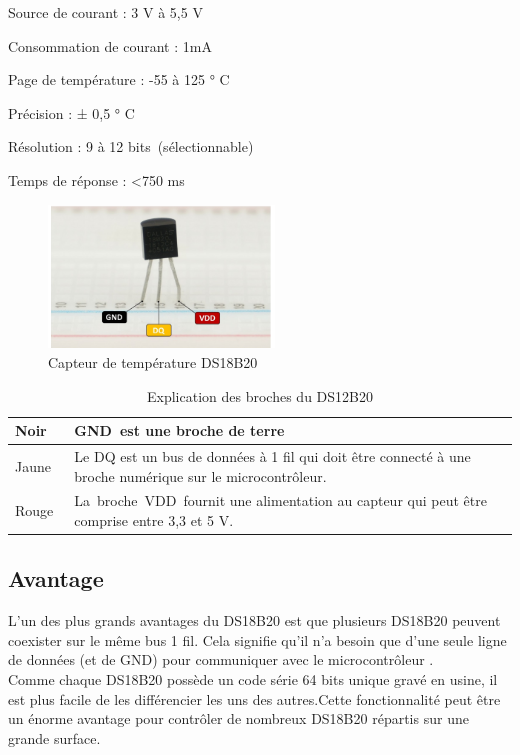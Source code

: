 \begin{filleditem}
	\item Source de courant	: 3 V à 5,5 V
	\item Consommation de courant :	1mA
	\item Page de température :	-55 à 125 ° C
	\item Précision : 	± 0,5 ° C
	\item Résolution :	9 à 12 bits (sélectionnable)
	\item Temps de réponse :	<750 ms
\end{filleditem}
\begin{figure}[H]
	\centering
	\includegraphics[width=6cm]{./img/DS18B20.png}
	\caption{Capteur de température DS18B20 }
	\label{i1}
\end{figure}

\begin{table}[H]
	\centering
	\caption{Explication des broches du DS12B20  } \vspace{5mm}
	\begin{tabular}[c]{|p{4cm}|p{10cm}|}
				
		\hline
		\rule[0.5cm]{0cm}{0cm} Noir	& GND est une broche de terre
		\\
		\hline
		\rule[0.5cm]{0cm}{0cm} Jaune &	Le DQ est un bus de données à 1 fil qui doit être connecté à une broche numérique sur le microcontrôleur.

		\\
		\hline
		\rule[0.5cm]{0cm}{0cm} Rouge &	La broche VDD fournit une alimentation au capteur qui peut être comprise entre 3,3 et 5 V.
		\\
		\hline
	
		
	\end{tabular}
\end{table}	


\subsection*{Avantage}
L'un des plus grands avantages du DS18B20 est que plusieurs DS18B20 peuvent coexister sur le même bus 1 fil. Cela signifie qu'il n'a besoin que d'une seule ligne de données (et de GND) pour communiquer avec le microcontrôleur .\\
Comme chaque DS18B20 possède un code série 64 bits unique gravé en usine, il est plus facile de les différencier les uns des autres.Cette fonctionnalité peut être un énorme avantage pour contrôler de nombreux DS18B20 répartis sur une grande surface. 
\\

